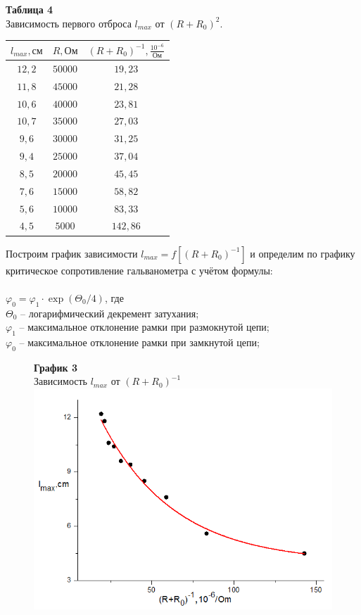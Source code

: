 \documentclass[11pt,a4paper]{article}
\begin{document}
\begin{table}[h!]
	\begin{center}
		\textbf{Таблица 4} \\
		Зависимость первого отброса $l_{max}$ от $(R+R_0)^2$.\\
		\begin{tabular}{|c|c|c|}
			\hline
$l_{max}, \text{см}$ & $R, \text{Ом}$	& $(R+R_0)^{-1}, \frac{10^{-6}}{\text{Ом}}$ \\ \hline
$12,2$ & $50000$ &	$19,23$ \\ \hline
$11,8$ & $45000$ &	$21,28$ \\ \hline
$10,6$ & $40000$ &	$23,81$ \\ \hline
$10,7$ & $35000$ &	$27,03$ \\ \hline
$9,6$  & $30000$ &	$31,25$ \\ \hline
$9,4$  & $25000$ &	$37,04$ \\ \hline
$8,5$  & $20000$ &	$45,45$ \\ \hline
$7,6$  & $15000$ &	$58,82$ \\ \hline
$5,6$  & $10000$ &	$83,33$ \\ \hline
$4,5$  & $5000$  &	$142,86$ \\ \hline
		\end{tabular}
\end{center}
\end{table}
Построим график зависимости $l_{max} = f[(R+R_0)^{-1}]$ и определим по графику критическое сопротивление гальванометра с учётом формулы:\\\\
$\varphi_0 = \varphi_1 \cdot \exp (\Theta_0/4)$, где \\
$\Theta_0$ -- логарифмический декремент затухания; \\
$\varphi_1$ -- максимальное отклонение рамки при размокнутой цепи; \\
$\varphi_0$ -- максимальное отклонение рамки при замкнутой цепи;
\newpage
\begin{figure}[h!]
		\centering
	\textbf{График 3}\\
	Зависимость $l_{max}$ от $(R+R_0)^{-1}$
	\includegraphics[width=0.7\linewidth]{23}
\end{figure}
\end{document}
